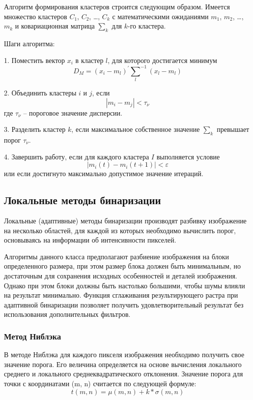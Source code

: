 \documentclass[a4paper,12pt]{article}
\begin{document}
Алгоритм формирования кластеров строится следующим образом.
Имеется множество кластеров $C_1$, $C_2$, …, $C_k$ с математическими
ожиданиями $m_1$, $m_2$, …, $m_k$ и ковариационная матрица $\sum_{k}$ для $k$-го кластера. 

Шаги алгоритма:

1. Поместить вектор $x_i$ в кластер $l$, для которого достигается
минимум
\begin{equation*}
    D_M = (x_i - m_l)^\prime {\sum_{l}}^{-1}(x_l - m_l)
\end{equation*}

2. Объединить кластеры $i$ и $j$, если
\begin{equation*}
    |m_i - m_j| < \tau_\nu
\end{equation*}
где $\tau_\nu$ – пороговое значение дисперсии.

3. Разделить кластер $k$, если максимальное собственное значение $\sum_{k}$ превышает порог $\tau_\nu$.

4. Завершить работу, если для каждого кластера $I$ выполняется
условие 
\begin{equation*}
    |m_i(t) - m_i(t+1)| < \varepsilon 
\end{equation*}
или если достигнуто максимально допустимое значение итераций.
\vspace{1,5cm}
\subsection{Локальные методы бинаризации}

Локальные (адаптивные) методы бинаризации производят разбивку изображение на
несколько областей, для каждой из которых необходимо вычислить порог, основываясь на
информации об интенсивности пикселей.

Алгоритмы данного класса предполагают разбиение изображения на блоки определенного
размера, при этом размер блока должен быть минимальным, но достаточным для сохранения
исходных особенностей и деталей изображения. Однако при этом блоки должны быть
настолько большими, чтобы шумы влияли на результат минимально. Функция сглаживания результирующего растра при адаптивной бинаризации позволяет получить
удовлетворительный результат без использования дополнительных фильтров.

\subsubsection*{Метод Ниблэка}
В методе Ниблэка для каждого пикселя изображения необходимо получить свое значение
порога. Его величина определяется на основе вычисления локального среднего и локального
среднеквадратического отклонения. Значение порога для точки с координатами (m, n)
считается по следующей формуле:
\begin{equation}
    t(m,n) = \mu(m,n) + k*\sigma(m,n)
\end{equation}
\end{document}
